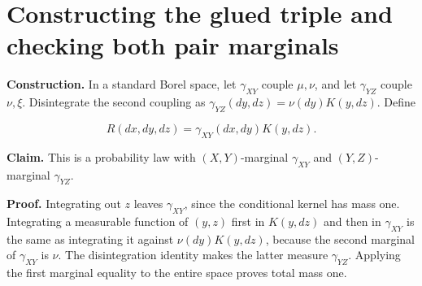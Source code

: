 \documentclass[11pt,a4paper]{article}
\begin{document}
\section{\texorpdfstring{Constructing the glued triple and checking both pair marginals}{Constructing the glued triple and checking both pair marginals}}


\textbf{Construction.} In a standard Borel space, let \(\gamma_{XY}\) couple \(\mu,\nu\), and let \(\gamma_{YZ}\) couple \(\nu,\xi\). Disintegrate the second coupling as \(\gamma_{YZ}(dy,dz)=\nu(dy)K(y,dz)\). Define

\[R(dx,dy,dz)=\gamma_{XY}(dx,dy)K(y,dz).\]


\textbf{Claim.} This is a probability law with \((X,Y)\)-marginal \(\gamma_{XY}\) and \((Y,Z)\)-marginal \(\gamma_{YZ}\).




\textbf{Proof.} Integrating out \(z\) leaves \(\gamma_{XY}\), since the conditional kernel has mass one. Integrating a measurable function of \((y,z)\) first in \(K(y,dz)\) and then in \(\gamma_{XY}\) is the same as integrating it against \(\nu(dy)K(y,dz)\), because the second marginal of \(\gamma_{XY}\) is \(\nu\). The disintegration identity makes the latter measure \(\gamma_{YZ}\). Applying the first marginal equality to the entire space proves total mass one.
\end{document}
